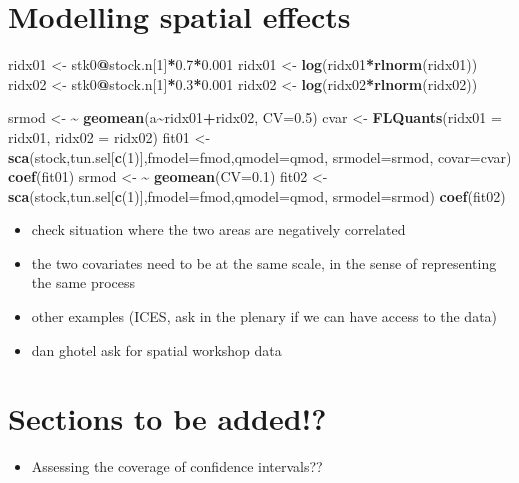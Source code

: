 \documentclass[
]{book}
\newenvironment{Shaded}{\begin{snugshade}}{\end{snugshade}}
\newcommand{\AttributeTok}[1]{\textcolor[rgb]{0.13,0.29,0.53}{#1}}
\newcommand{\DecValTok}[1]{\textcolor[rgb]{0.00,0.00,0.81}{#1}}
\newcommand{\ErrorTok}[1]{\textcolor[rgb]{0.64,0.00,0.00}{\textbf{#1}}}
\newcommand{\FloatTok}[1]{\textcolor[rgb]{0.00,0.00,0.81}{#1}}
\newcommand{\FunctionTok}[1]{\textcolor[rgb]{0.13,0.29,0.53}{\textbf{#1}}}
\newcommand{\NormalTok}[1]{#1}
\newcommand{\OtherTok}[1]{\textcolor[rgb]{0.56,0.35,0.01}{#1}}
\newcommand{\SpecialCharTok}[1]{\textcolor[rgb]{0.81,0.36,0.00}{\textbf{#1}}}
\providecommand{\tightlist}{%
  \setlength{\itemsep}{0pt}\setlength{\parskip}{0pt}}
\begin{document}
\hypertarget{modelling-spatial-effects}{%
\chapter{Modelling spatial effects}\label{modelling-spatial-effects}}

\begin{Shaded}
\begin{Highlighting}[]
\NormalTok{ridx01 }\OtherTok{\textless{}{-}}\NormalTok{ stk0}\SpecialCharTok{@}\NormalTok{stock.n[}\DecValTok{1}\NormalTok{]}\SpecialCharTok{*}\FloatTok{0.7}\SpecialCharTok{*}\FloatTok{0.001}
\NormalTok{ridx01 }\OtherTok{\textless{}{-}} \FunctionTok{log}\NormalTok{(ridx01}\SpecialCharTok{*}\FunctionTok{rlnorm}\NormalTok{(ridx01))}
\NormalTok{ridx02 }\OtherTok{\textless{}{-}}\NormalTok{ stk0}\SpecialCharTok{@}\NormalTok{stock.n[}\DecValTok{1}\NormalTok{]}\SpecialCharTok{*}\FloatTok{0.3}\SpecialCharTok{*}\FloatTok{0.001}
\NormalTok{ridx02 }\OtherTok{\textless{}{-}} \FunctionTok{log}\NormalTok{(ridx02}\SpecialCharTok{*}\FunctionTok{rlnorm}\NormalTok{(ridx02))}

\NormalTok{srmod }\OtherTok{\textless{}{-}} \ErrorTok{\textasciitilde{}} \FunctionTok{geomean}\NormalTok{(a}\SpecialCharTok{\textasciitilde{}}\NormalTok{ridx01}\SpecialCharTok{+}\NormalTok{ridx02, }\AttributeTok{CV=}\FloatTok{0.5}\NormalTok{)}
\NormalTok{cvar }\OtherTok{\textless{}{-}} \FunctionTok{FLQuants}\NormalTok{(}\AttributeTok{ridx01 =}\NormalTok{ ridx01, }\AttributeTok{ridx02 =}\NormalTok{ ridx02)}
\NormalTok{fit01 }\OtherTok{\textless{}{-}} \FunctionTok{sca}\NormalTok{(stock,tun.sel[}\FunctionTok{c}\NormalTok{(}\DecValTok{1}\NormalTok{)],}\AttributeTok{fmodel=}\NormalTok{fmod,}\AttributeTok{qmodel=}\NormalTok{qmod, }\AttributeTok{srmodel=}\NormalTok{srmod, }\AttributeTok{covar=}\NormalTok{cvar)}
\FunctionTok{coef}\NormalTok{(fit01)}
\NormalTok{srmod }\OtherTok{\textless{}{-}} \ErrorTok{\textasciitilde{}} \FunctionTok{geomean}\NormalTok{(}\AttributeTok{CV=}\FloatTok{0.1}\NormalTok{)}
\NormalTok{fit02 }\OtherTok{\textless{}{-}} \FunctionTok{sca}\NormalTok{(stock,tun.sel[}\FunctionTok{c}\NormalTok{(}\DecValTok{1}\NormalTok{)],}\AttributeTok{fmodel=}\NormalTok{fmod,}\AttributeTok{qmodel=}\NormalTok{qmod, }\AttributeTok{srmodel=}\NormalTok{srmod)}
\FunctionTok{coef}\NormalTok{(fit02)}
\end{Highlighting}
\end{Shaded}

\begin{itemize}
\tightlist
\item
  check situation where the two areas are negatively correlated
\item
  the two covariates need to be at the same scale, in the sense of representing the same process
\item
  other examples (ICES, ask in the plenary if we can have access to the data)
\item
  dan ghotel ask for spatial workshop data
\end{itemize}

\hypertarget{sections-to-be-added}{%
\chapter{Sections to be added!?}\label{sections-to-be-added}}

\begin{itemize}
\tightlist
\item
  Assessing the coverage of confidence intervals??
\end{itemize}
\end{document}
